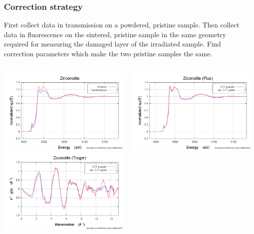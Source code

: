 \documentclass[10pt, xcolor=x11names, compress]{beamer}
\begin{document}
\begin{frame}
  \frametitle{Correction strategy}
  \small
  First collect data in transmission on a powdered, pristine sample.
  Then collect data in fluorescence on the sintered, pristine sample
  in the same geometry required for measuring the damaged layer of the
  irradiated sample.  Find correction parameters which make the two
  pristine samples the same.
  \begin{columns}
    \begin{column}{0.5\linewidth}
      \begin{center}
        \includegraphics[width=0.8\linewidth]{images/pristine.png}\\
        \includegraphics[width=0.8\linewidth]{images/zirconolite_chik.png}
      \end{center}
    \end{column}
    \begin{column}{0.5\linewidth}
      \begin{center}
        \includegraphics[width=0.8\linewidth]{images/zirconolite_mu.png}\\

\end{center}
\end{column}
\end{columns}
\end{frame}
\end{document}
